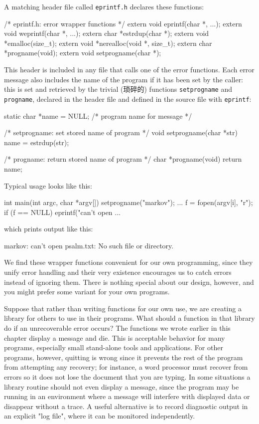 A matching header file called \verb'eprintf.h' declares these functions:
\begin{wellcode}
    /* eprintf.h: error wrapper functions */
    extern void eprintf(char *, ...);
    extern void weprintf(char *, ...);
    extern char *estrdup(char *);
    extern void *emalloc(size_t);
    extern void *nerealloc(void *, size_t);
    extern char *progname(void);
    extern void setprogname(char *);
\end{wellcode}
This header is included in any file that calls one of the error functions.
Each error message also includes the name of the program if it has been set
by the caller: this is set and retrieved by the trivial (琐碎的) functions
\verb'setprogname' and \verb'progname', declared in the header file and
defined in the source file with \verb'eprintf':
\begin{wellcode}
    static char *name = NULL; /* program name for message */

    /* setprogname: set stored name of program */
    void setprogname(char *str)
    {
        name = estrdup(str);
    }

    /* progname: return stored name of program */
    char *progname(void)
    {
        return name;
    }
\end{wellcode}
Typical usage looks like this:
\begin{wellcode}
    int main(int argc, char *argv[])
    {
        setprogname("markov");
        ...
        f = fopen(argv[i], "r");
        if (f == NULL)
            eprintf("can't open %
        ...
    }
\end{wellcode}
which prints output like this:
\begin{wellcode}
    markov: can't open psalm.txt: No such file or directory.
\end{wellcode}

We find these wrapper functions convenient for our own programming, since
they unify error handling and their very existence encourages us to catch
errors instead of ignoring them. There is nothing special about our design,
however, and you might prefer some variant for your own programs.

Suppose that rather than writing functions for our own use, we are creating
a library for others to use in their programs. What should a function in
that library do if an unrecoverable error occurs? The functions we wrote
earlier in this chapter display a message and die. This is acceptable
behavior for many programs, especially small stand-alone tools and
applications. For other programs, however, quitting is wrong since it
prevents the rest of the program from attempting any recovery; for
instance, a word processor must recover from errors so it does not lose the
document that you are typing. In some situations a library routine should
not even display a message, since the program may be running in an
environment where a message will interfere with displayed data or disappear
without a trace. A useful alternative is to record diagnostic output in an
explicit "log file", where it can be monitored independently.

